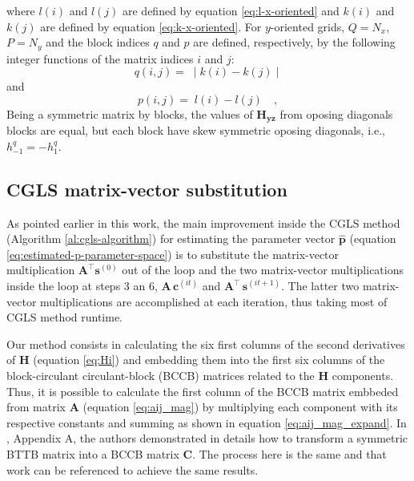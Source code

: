 where $l(i)$ and $l(j)$ are defined by equation \ref{eq:l-x-oriented} 
and $k(i)$ and $k(j)$ are defined by equation \ref{eq:k-x-oriented}.
For $y$-oriented grids, $Q = N_{x}$, $P = N_{y}$ and the block indices
$q$ and $p$ are defined, respectively, by the following integer functions 
of the matrix indices $i$ and $j$:
\begin{equation}
	q(i, j) = \; \mid k(i) - k(j) \mid
	\label{eq:Hyz-q-y-oriented}
\end{equation}
and
\begin{equation}
	p(i, j) = \; l(i) - l(j) \quad ,
	\label{eq:Hyz-p-y-oriented}
\end{equation}
Being a symmetric matrix by blocks, the values of $\mathbf{H_{yz}}$ from oposing diagonals blocks are equal, but each block have skew symmetric oposing diagonals, i.e., $h^{q}_{-1} = - h^{q}_{1}$.

\subsection{CGLS matrix-vector substitution}

As pointed earlier in this work, the main improvement inside the CGLS method (Algorithm \ref{al:cgls-algorithm}) for estimating the parameter vector $\hat{\mathbf{p}}$ (equation \ref{eq:estimated-p-parameter-space}) is to substitute the matrix-vector multiplication $\mathbf{A}^{\top} \mathbf{s}^{(0)}$ out of the loop and the two matrix-vector multiplications inside the loop at steps 3 an 6, $\mathbf{A} \, \mathbf{c}^{(it)}$ and $\mathbf{A}^{\top} \, \mathbf{s}^{(it + 1)}$.
The latter two matrix-vector multiplications are accomplished at each iteration, thus taking most of CGLS method runtime.

Our method consists in calculating the six first columns of the second derivatives of $\mathbf{H}$ (equation \ref{eq:Hi}) and embedding them into the first six columns of the block-circulant circulant-block (BCCB) matrices related to the $\mathbf{H}$ components. Thus, it is possible to calculate the first column of the BCCB matrix embbeded from matrix $\mathbf{A}$ (equation \ref{eq:aij_mag}) by multiplying each component with its respective constants and summing as shown in equation \ref{eq:aij_mag_expand}. In \cite{takahashi2020convolutional}, Appendix A, the authors demonstrated in details how to transform a symmetric BTTB matrix into a BCCB matrix $\mathbf{C}$. The process here is the same and that work can be referenced to achieve the same results.


